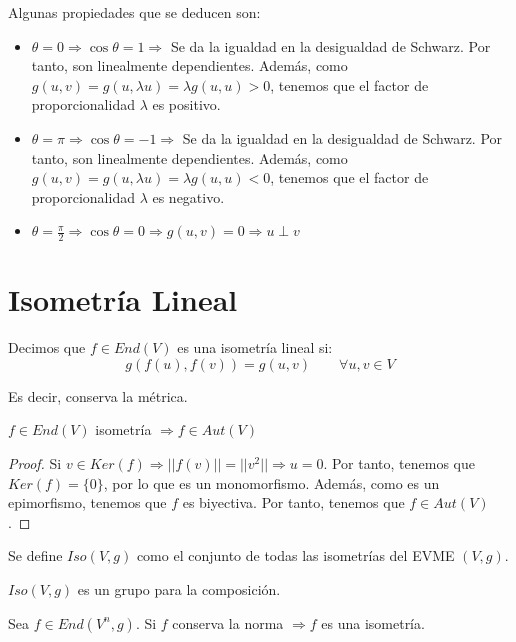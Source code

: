Algunas propiedades que se deducen son:
\begin{itemize}
    \item $\theta = 0 \Longrightarrow \cos \theta = 1 \Longrightarrow$ Se da la igualdad en la desigualdad de Schwarz. Por tanto, son linealmente dependientes. Además, como $g(u,v)=g(u,\lambda u) = \lambda g(u,u)>0$, tenemos que el factor de proporcionalidad $\lambda$ es positivo.

    \item $\theta = \pi \Longrightarrow \cos \theta = -1 \Longrightarrow$ Se da la igualdad en la desigualdad de Schwarz. Por tanto, son linealmente dependientes. Además, como $g(u,v)=g(u,\lambda u) = \lambda g(u,u)<0$, tenemos que el factor de proporcionalidad $\lambda$ es negativo.

    \item $\theta = \frac{\pi}{2} \Longrightarrow \cos \theta = 0 \Longrightarrow g(u,v)=0 \Longrightarrow u\perp v$  
\end{itemize}


\section{Isometría Lineal}
\begin{definicion} 
    Decimos que $f\in End(V)$ es una isometría lineal si:
    $$g(f(u), f(v))=g(u,v) \qquad \forall u,v\in V$$

    Es decir, conserva la métrica.
\end{definicion}

\begin{prop}
    $f\in End(V)$ isometría $\Longrightarrow f \in Aut(V)$
\end{prop}
\begin{proof}
    Si $v\in Ker(f)\Longrightarrow ||f(v)||=||v^2|| \Longrightarrow u=0$. Por tanto, tenemos que $Ker(f)=\{0\}$, por lo que es un monomorfismo. Además, como es un epimorfismo, tenemos que $f$ es biyectiva. Por tanto, tenemos que $f\in Aut(V)$.
\end{proof}

\begin{definicion}
    Se define $Iso(V,g)$ como el conjunto de todas las isometrías del EVME $(V,g)$.
\end{definicion}
\begin{prop}
    $Iso(V,g)$ es un grupo para la composición.
\end{prop}

\begin{prop}
    Sea $f\in End(V^n, g)$. Si $f$ conserva la norma $\Longrightarrow f$ es una isometría.
\end{prop}

